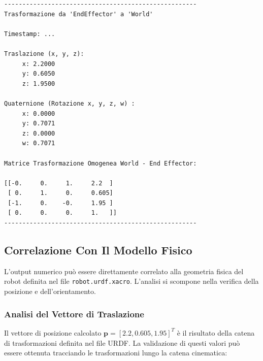 \documentclass[11pt, a4paper]{report}
\begin{document}
\begin{verbatim}
-----------------------------------------------------
Trasformazione da 'EndEffector' a 'World'

Timestamp: ...

Traslazione (x, y, z):
     x: 2.2000
     y: 0.6050
     z: 1.9500

Quaternione (Rotazione x, y, z, w) :
     x: 0.0000
     y: 0.7071
     z: 0.0000
     w: 0.7071

Matrice Trasformazione Omogenea World - End Effector:

[[-0.     0.     1.     2.2  ]
 [ 0.     1.     0.     0.605]
 [-1.     0.    -0.     1.95 ]
 [ 0.     0.     0.     1.   ]]
-----------------------------------------------------
\end{verbatim}

\newpage
\subsection{Correlazione Con Il Modello Fisico}
\label{subsec:discussione_risultati}
L'output numerico può essere direttamente correlato alla geometria fisica del robot definita nel file \texttt{robot.urdf.xacro}. L'analisi si scompone nella verifica della posizione e dell'orientamento.

\subsubsection{Analisi del Vettore di Traslazione}
\label{subsec:analisi_vettore_traslazione}
Il vettore di posizione calcolato \(\textbf{p} = [2.2, 0.605, 1.95]^T\) è il risultato della catena di trasformazioni definita nel file URDF. La validazione di questi valori può essere ottenuta tracciando le trasformazioni lungo la catena cinematica:
\end{document}
